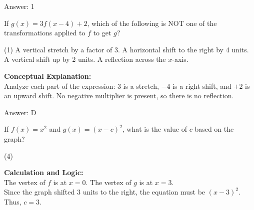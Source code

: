 \documentclass[11pt,paper=a4,answers]{exam}
\begin{document}
\begin{questions}
\begin{solution}
\vspace{25pt}

Answer: \colorbox{yellow!100}{1}
\end{solution}

\vspace{40pt}

\question
If $g(x) = 3f(x-4) + 2$, which of the following is NOT one of the transformations applied to $f$ to get $g$?
\begin{tasks}(1)
    \task A vertical stretch by a factor of 3.
    \task A horizontal shift to the right by 4 units.
    \task A vertical shift up by 2 units.
    \task A reflection across the $x$-axis.
\end{tasks}

\begin{solution}
\textbf{Conceptual Explanation:} \\
Analyze each part of the expression: $3$ is a stretch, $-4$ is a right shift, and $+2$ is an upward shift. No negative multiplier is present, so there is no reflection.

\vspace{25pt}

Answer: \colorbox{yellow!100}{D}
\end{solution}

\vspace{40pt}

\question
\begin{center}
\end{center}
If $f(x) = x^2$ and $g(x) = (x-c)^2$, what is the value of $c$ based on the graph?
\begin{tasks}(4)
\end{tasks}

\begin{solution}
\textbf{Calculation and Logic:} \\
The vertex of $f$ is at $x = 0$. The vertex of $g$ is at $x = 3$. \\
Since the graph shifted 3 units to the right, the equation must be $(x-3)^2$. Thus, $c = 3$.


\end{solution}
\end{questions}
\end{document}
